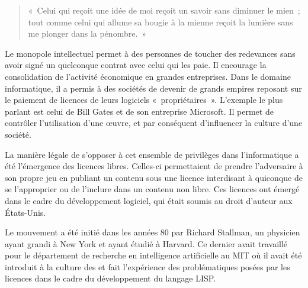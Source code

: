 \begin{quote}
«~Celui qui reçoit une idée de moi reçoit un savoir sans diminuer le mien~; tout comme celui qui allume sa bougie à la mienne reçoit la lumière sans me plonger dans la pénombre.~»
\end{quote} %

Le monopole intellectuel permet à des personnes de toucher des redevances sans avoir signé un quelconque contrat avec celui qui les paie. Il encourage la consolidation de l'activité économique en grandes entreprises. Dans le domaine informatique, il a permis à des sociétés de devenir de grands empires reposant sur le paiement de licences de leurs logiciels «~propriétaires~». L'exemple le plus parlant est celui de Bill Gates et de son entreprise Microsoft. Il permet de contrôler l'utilisation d'une œuvre, et par conséquent d'influencer la culture d'une société. %

La manière légale de s'opposer à cet ensemble de privilèges dans l'informatique a été l'émergence des licences libres. Celles-ci permettaient de prendre l'adversaire à son propre jeu en publiant un contenu sous une licence interdisant à quiconque de se l'approprier ou de l'inclure dans un contenu non libre. Ces licences ont émergé dans le cadre du développement logiciel, qui était soumis au droit d'auteur aux États-Unis.

Le mouvement a été initié dans les années 80 par Richard Stallman, un physicien ayant grandi à New York et ayant étudié à Harvard. Ce dernier avait travaillé pour le département de recherche en intelligence artificielle au MIT où il avait été introduit à la culture des  et fait l'expérience des problématiques posées par les licences dans le cadre du développement du langage LISP.

